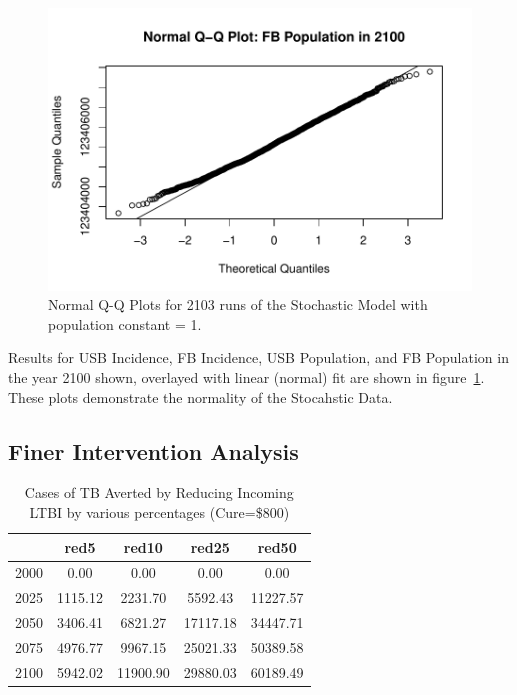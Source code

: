 \documentclass{amsart}
\begin{document}
\begin{figure}
    \includegraphics[scale=0.4]{figures/qqnormFBPop.pdf}
  \caption{Normal Q-Q Plots for 2103 runs of the Stochastic Model with population constant = 1.}
  \label{fig:qqnormPlots}
\end{figure}

Results for USB Incidence, FB Incidence, USB Population, and FB Population in the year
2100 shown, overlayed with linear (normal) fit are shown in
figure~\ref{fig:qqnormPlots}. These plots demonstrate the normality of the
Stocahstic Data. 
\subsection{Finer Intervention Analysis}

\begin{table}
\centering
\begin{tabular}{|r|cccc|} \hline
       & red5    & red10    & red25    & red50    \\ \hline
  2000 & 0.00    & 0.00     & 0.00     & 0.00     \\ 
  2025 & 1115.12 & 2231.70  & 5592.43  & 11227.57 \\ 
  2050 & 3406.41 & 6821.27  & 17117.18 & 34447.71 \\ 
  2075 & 4976.77 & 9967.15  & 25021.33 & 50389.58 \\ 
  2100 & 5942.02 & 11900.90 & 29880.03 & 60189.49 \\ 
   \hline
\end{tabular}
\caption{Cases of TB Averted by Reducing Incoming LTBI by various percentages
         (Cure=\$800)} 
\label{tab:caRed}
\end{table}
\end{document}
